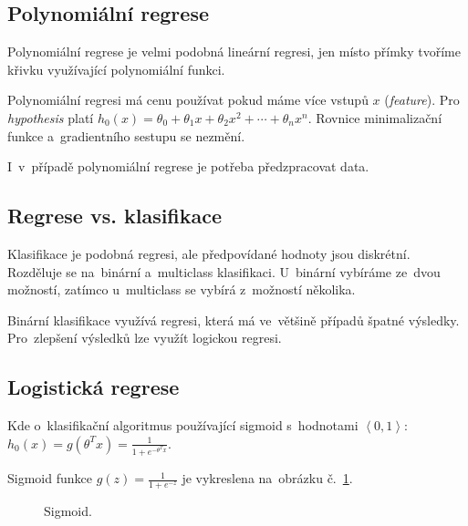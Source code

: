 \subsection{Polynomiální regrese}

Polynomiální regrese je velmi podobná lineární regresi, jen místo přímky tvoříme křivku využívající polynomiální funkci.

Polynomiální regresi má cenu používat pokud máme více vstupů $x$ (\emph{feature}).
Pro \emph{hypothesis} platí $h_0(x) = \theta_0 + \theta_1 x + \theta_2 x^2 + \cdots + \theta_n x^n$.
Rovnice minimalizační funkce a~gradientního sestupu se nezmění.

I~v~případě polynomiální regrese je potřeba předzpracovat data.

\subsection{Regrese vs. klasifikace}

Klasifikace je podobná regresi, ale předpovídané hodnoty jsou diskrétní.
Rozděluje se na~binární a~multiclass klasifikaci.
U~binární vybíráme ze~dvou možností, zatímco u~multiclass se vybírá z~možností několika.

Binární klasifikace využívá regresi, která má ve~většině případů špatné výsledky.
Pro~zlepšení výsledků lze využít logickou regresi.

\subsection{Logistická regrese}

Kde o~klasifikační algoritmus používající sigmoid s~hodnotami $\left<0, 1\right>$:
$h_0(x) = g(\theta^T x) = \frac{1}{1+e^{-\theta^T x}}$.

Sigmoid funkce $g(z) = \frac{1}{1+e^{-z}}$ je vykreslena na~obrázku č.~\ref{logisticka-regrese-sigmoid}.

\begin{figure}[ht]
    \onehalfspacing
    \centering
    \caption{Sigmoid.}
    \label{logisticka-regrese-sigmoid}
\end{figure}

